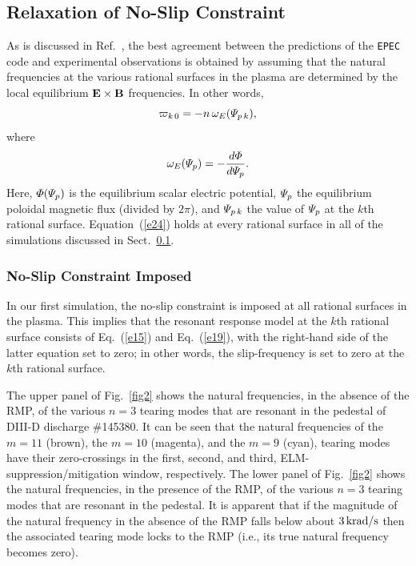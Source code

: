 \documentclass[12pt,prb,aps]{revtex4-1}
\begin{document}
\subsection{Relaxation of No-Slip Constraint}\label{s4a}
As is discussed in Ref.~, the best agreement between the predictions of the {\tt EPEC} code and experimental observations is
obtained by assuming that the natural frequencies at the various rational surfaces in the plasma are determined by the
local equilibrium ${\bf E}\times {\bf B}$ frequencies. In other words, 
\begin{equation}\label{e24}
\varpi_{k\,0} =-n\,\omega_E({\mit\Psi}_{p\,k}),
\end{equation}
where 
\begin{equation}
\omega_E({\mit\Psi}_p) = -\frac{d{\mit\Phi}}{d{\mit\Psi}_p}.
\end{equation}
Here, ${\mit\Phi}({\mit\Psi}_p)$ is the equilibrium scalar electric potential, ${\mit\Psi}_p$ the equilibrium poloidal magnetic flux (divided by $2\pi$), 
and ${\mit\Psi}_{p\,k}$  the value of ${\mit\Psi}_p$ at the $k$th rational surface.  Equation~(\ref{e24}) holds at
every rational surface in all of the simulations discussed in Sect.~\ref{s4a}. 

\subsubsection{No-Slip Constraint Imposed}
In our first simulation, the no-slip constraint is imposed at all rational surfaces in the plasma. This implies that the resonant response
model at the $k$th rational surface consists of Eq.~(\ref{e15}) and Eq.~(\ref{e19}), with the right-hand side of the latter equation
set to zero; in other words,  the slip-frequency is set to zero at the $k$th rational surface.

The upper panel of Fig.~\ref{fig2} shows the natural frequencies, in the absence of the RMP, of the various  $n=3$ tearing modes 
 that are resonant in the pedestal of DIII-D discharge \#145380. It can be seen that 
the natural frequencies of the $m=11$ (brown), the $m=10$ (magenta), and the $m=9$ (cyan), tearing modes have their
zero-crossings in the  first, second, and third, ELM-suppression/mitigation window, respectively. 
  The lower panel of Fig.~\ref{fig2} shows the natural frequencies, in the presence of the RMP, of the various $n=3$
tearing modes that are resonant in the pedestal. It is apparent that if the magnitude of the natural frequency in the absence of the RMP falls below about
$3\,{\rm krad/s}$ then the associated tearing mode locks to the RMP (i.e., its true natural frequency becomes zero). 
\end{document}
